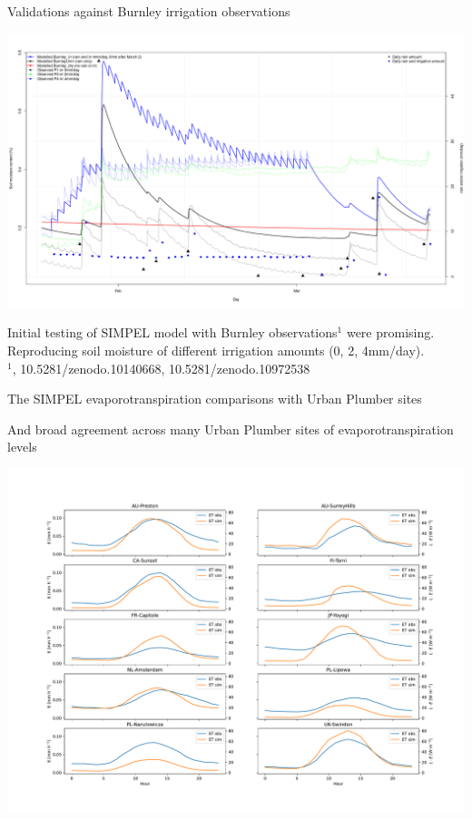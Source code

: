 \documentclass{beamer}
\begin{document}
\begin{frame}{Validations against Burnley irrigation observations} 
\begin{center}
\includegraphics[scale=0.18]{BurnleyComparisons.png}
\end{center}

Initial testing of SIMPEL model with Burnley observations$^{1}$ were promising. Reproducing soil moisture of different irrigation amounts (0, 2, 4mm/day).
\\
{\tiny $^{1}$\cite{Cheung2024}, 10.5281/zenodo.10140668, 10.5281/zenodo.10972538}
\end{frame}



\begin{frame}{The SIMPEL evaporotranspiration comparisons with Urban Plumber sites} 

{\footnotesize And broad agreement across many Urban Plumber sites of evaporotranspiration levels}
\begin{center}
\includegraphics[scale=0.24]{et_presunangle.pdf}
\end{center}
\end{frame}
\end{document}
